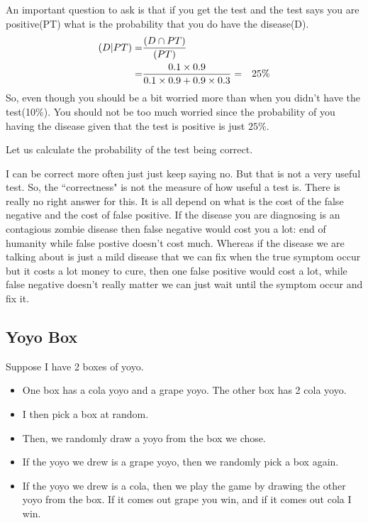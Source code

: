 \documentclass[a4paper, 12pt]{article}
\let\Pr\relax
\DeclareMathOperator{\Pr}{Pr}
\begin{document}
\begin{multicols}{2}
\begin{center}
	
\end{center}

An important question to ask is that if you get the test and the test says you are positive(PT) what is the probability that you do have the disease(D).
\begin{align*}
	\Pr(D|PT) =& \frac{\Pr(D \cap PT)}{\Pr(PT)}\\
	=& \frac{0.1 \times 0.9 }{0.1\times 0.9 + 0.9 \times 0.3}
	=& 25\%
\end{align*}
So, even though you should be a bit worried more than when you didn't have the test(10\%). You should not be too much worried since the probability of you having the disease given that the test is positive is just $25\%$.

Let us calculate the probability of the test being correct.

I can be correct more often just just keep saying no. But that is not a very useful test. So, the ``correctness" is not the measure of how useful a test is. There is really no right answer for this. It is all depend on what is the cost of the false negative and the cost of false positive. If the disease you are diagnosing is an contagious zombie disease then false negative would cost you a lot: end of humanity while false postive doesn't cost much. Whereas if the disease we are talking about is just a mild disease that we can fix when the true symptom occur  but it costs a lot money to cure, then one false positive would cost a lot, while false negative doesn't really matter we can just wait until the symptom occur and fix it.

\subsection*{Yoyo Box}

Suppose I have 2 boxes of yoyo.
\begin{itemize}
	\item One box has a cola yoyo and a grape yoyo. The other box has 2 cola yoyo.
	\item I then pick a box at random.
	\item Then, we randomly draw a yoyo from the box we chose. 
	\item If the yoyo we drew is a grape yoyo, then we randomly pick a box again.
	\item If the yoyo we drew is a cola, then we play the game by drawing the other yoyo from the box. If it comes out grape you win, and if it comes out cola I win.
\end{itemize}


\end{multicols}
\end{document}
